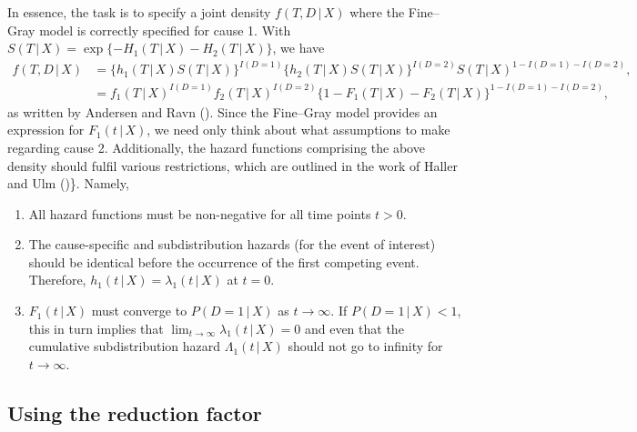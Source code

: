 \documentclass[
  letterpaper,
  paper=240mm:170mm,
  twoside=true,
  open=right,
  fontsize=10pt,
  pagesize=false,
  BCOR=15mm,
  DIV=14,
  headinclude=true,
  footinclude=false,
  headsepline=on]{scrbook}
\providecommand{\tightlist}{%
  \setlength{\itemsep}{0pt}\setlength{\parskip}{0pt}}\usepackage{longtable,booktabs,array}
\newcommand{\given}{\,|\,}
\begin{document}
In essence, the task is to specify a joint density \(f(T, D \given X)\)
where the Fine--Gray model is correctly specified for cause 1. With
\(S(T \given X) = \exp\{-H_1(T \given X) - H_2(T \given X)\}\), we have
\begin{align*}
    f(T,D \given X) &= \{h_1(T \given X)S(T \given X)\}^{I(D = 1)}\{h_2(T \given X)S(T \given X)\}^{I(D = 2)}S(T \given X)^{1 - I(D = 1) - I(D = 2)}, \\
    &= f_1(T \given X)^{I(D = 1)}f_2(T \given X)^{I(D = 2)}\{1 - F_1(T \given X) - F_2(T \given X)\}^{1 - I(D = 1) - I(D = 2)},
\end{align*} as written by Andersen and Ravn
(). Since the
Fine--Gray model provides an expression for \(F_1(t \given X)\), we need
only think about what assumptions to make regarding cause 2.
Additionally, the hazard functions comprising the above density should
fulfil various restrictions, which are outlined in the work of Haller
and Ulm ()\}.
Namely,

\begin{enumerate}
\def\labelenumi{\arabic{enumi}.}
\tightlist
\item
  All hazard functions must be non-negative for all time points
  \(t > 0\).
\item
  The cause-specific and subdistribution hazards (for the event of
  interest) should be identical before the occurrence of the first
  competing event. Therefore,
  \(h_1(t \given X) = \lambda_1(t \given X)\) at \(t = 0\).
\item
  \(F_1(t \given X)\) must converge to \(P(D = 1 \given X)\) as
  \(t \to \infty\). If \(P(D = 1 \given X) < 1\), this in turn implies
  that \(\lim_{t \to \infty} \lambda_1(t \given X) = 0\) and even that
  the cumulative subdistribution hazard \(\Lambda_1(t \given X)\) should
  not go to infinity for \(t \to \infty\).
\end{enumerate}

\subsection{Using the reduction
factor}\label{using-the-reduction-factor}
\end{document}
